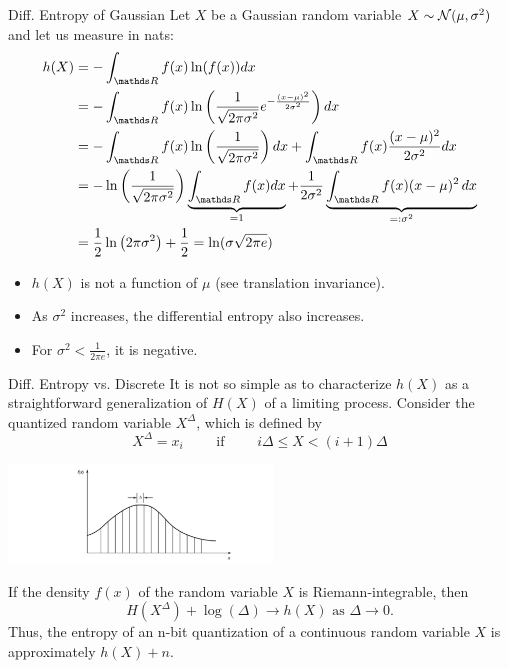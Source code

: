 \begin{vbframe}{Diff. Entropy of Gaussian}
Let $X$ be a Gaussian random variable $X \sim \mathcal{N}(\mu, \sigma^2)$ and let us measure in nats:
  \begin{equation*}
    \begin{aligned} 
     h(X) &= - \int_{\R} f(x) \ln(f(x)) dx \\
          &=  - \int_{\R} f(x) \ln\left(\frac{1}{\sqrt{2 \pi \sigma^{2}}} e^{-\frac{(x-\mu)^{2}}{2 \sigma^{2}}} \right) dx \\
          &= - \int_{\R} f(x) \ln\left(\frac{1}{\sqrt{2 \pi \sigma^{2}}}\right) dx + \int_{\R} f(x) \frac{(x-\mu)^{2}}{2 \sigma^{2}} dx \\
          &= - \ln \left(\frac{1}{\sqrt{2 \pi \sigma^{2}}}\right) \underbrace{\int_{\R} f(x) dx}_{= 1} + \frac{1}{2\sigma^2} \underbrace{\int_{\R} f(x) (x-\mu)^{2}\,dx}_{=: \sigma^2} \\
          &= \frac{1}{2} \ln \left(2 \pi \sigma^{2}\right) + \frac{1}{2} =  \ln(\sigma \sqrt{2\pi e})
    \end{aligned}
  \end{equation*}
\framebreak

  \begin{itemize}
    \item $h(X)$ is not a function of $\mu$ (see translation invariance).
    \item As $\sigma^2$ increases, the differential entropy also increases.
    \item For $\sigma^2 < \frac{1}{2\pi e}$, it is negative.
    
  \end{itemize}
\end{vbframe}


\begin{vbframe}{Diff. Entropy vs. Discrete}
It is not so simple as to characterize $h(X)$ as 
a straightforward generalization of $H(X)$ of a limiting process.
Consider the quantized random variable $X^\Delta$, which is defined by
$$X^\Delta = x_i \qquad \text{ if } \qquad i \Delta \leq X < (i + 1) \Delta$$  
\begin{center}
\includegraphics[width = 7cm ]{figure_man/diffent-quant.png} \\
\end{center}

If the density $f(x)$ of the random variable $X$ is Riemann-integrable, then
$$H(X^\Delta) + \log(\Delta) \rightarrow h(X) \text{ as } \Delta \rightarrow 0.$$
Thus, the entropy of an n-bit quantization of a continuous random variable 
$X$ is approximately $h(X) + n$.
\end{vbframe}

